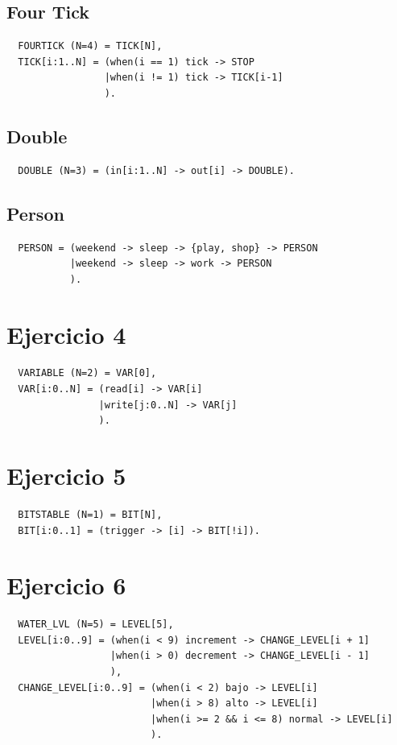 \documentclass{article}
\begin{document}
\subsection*{Four Tick}
\begin{verbatim}
  FOURTICK (N=4) = TICK[N],
  TICK[i:1..N] = (when(i == 1) tick -> STOP 
                 |when(i != 1) tick -> TICK[i-1]
                 ).
\end{verbatim}

\subsection*{Double}
\begin{verbatim}
  DOUBLE (N=3) = (in[i:1..N] -> out[i] -> DOUBLE).
\end{verbatim}

\subsection*{Person}
\begin{verbatim}
  PERSON = (weekend -> sleep -> {play, shop} -> PERSON
           |weekend -> sleep -> work -> PERSON
           ).
\end{verbatim}

\section*{Ejercicio 4}
\begin{verbatim}
  VARIABLE (N=2) = VAR[0],
  VAR[i:0..N] = (read[i] -> VAR[i]
                |write[j:0..N] -> VAR[j]
                ).
\end{verbatim}

\section*{Ejercicio 5}
\begin{verbatim}
  BITSTABLE (N=1) = BIT[N],
  BIT[i:0..1] = (trigger -> [i] -> BIT[!i]).
\end{verbatim}

\section*{Ejercicio 6}
\begin{verbatim}
  WATER_LVL (N=5) = LEVEL[5],
  LEVEL[i:0..9] = (when(i < 9) increment -> CHANGE_LEVEL[i + 1]
                  |when(i > 0) decrement -> CHANGE_LEVEL[i - 1]
                  ),
  CHANGE_LEVEL[i:0..9] = (when(i < 2) bajo -> LEVEL[i]
                         |when(i > 8) alto -> LEVEL[i]
                         |when(i >= 2 && i <= 8) normal -> LEVEL[i]
                         ).
\end{verbatim}
\end{document}
